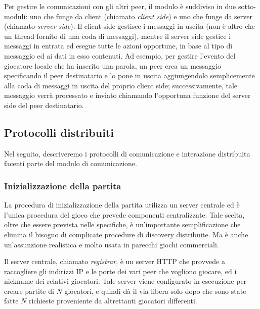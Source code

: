 \documentclass[10.5pt]{article}
\begin{document}
Per gestire le comunicazioni con gli altri peer, il modulo è suddiviso in due sotto-moduli: uno che funge da client (chiamato \emph{client side}) e uno che funge da server (chiamato \emph{server side}). Il client side gestisce i messaggi in uscita (non è altro che un thread fornito di una coda di messaggi), mentre il server side gestice i messaggi in entrata ed esegue tutte le azioni opportune, in base al tipo di messaggio ed ai dati in esso contenuti. 
Ad esempio, per gestire l'evento del giocatore locale che ha inserito una parola, un peer crea un messaggio specificando il peer destinatario e lo pone in uscita aggiungendolo semplicemente alla coda di messaggi in uscita del proprio client side; successivamente, tale messaggio verrà processato e inviato chiamando l'opportuna funzione del server side del peer destinatario.


\subsection{Protocolli distribuiti}
Nel seguito, descriveremo i protocolli di comunicazione e interazione distribuita facenti parte del modulo di comunicazione.

\subsubsection{Inizializzazione della partita}

La procedura di inizializzazione della partita utilizza un server centrale ed è l'unica procedura del gioco che prevede componenti centralizzate. Tale scelta, oltre che essere prevista nelle specifiche, è un'importante semplificazione che elimina il bisogno di complicate procedure di discovery distribuite. Ma è anche un'assunzione realistica e molto usata in parecchi giochi commerciali.

Il server centrale, chiamato \textit{registrar}, è un server HTTP che provvede a raccogliere gli indirizzi IP e le porte dei vari peer che vogliono giocare, ed i nickname dei relativi giocatori. Tale server viene configurato in esecuzione per creare partite di $N$ giocatori, e quindi dà il via libera solo dopo che sono state fatte $N$ richieste proveniente da altrettanti giocatori differenti.
\end{document}
